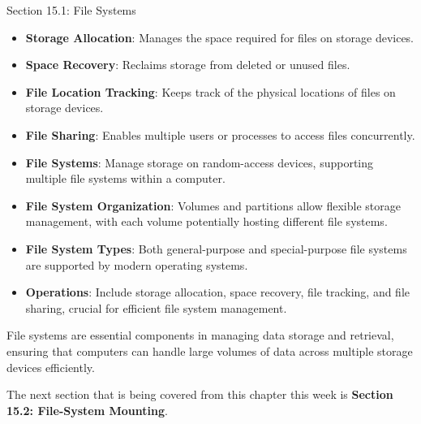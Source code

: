 \begin{notes}{Section 15.1: File Systems}
\begin{highlight}
        \begin{itemize}
            \item \textbf{Storage Allocation}: Manages the space required for files on storage devices.
            \item \textbf{Space Recovery}: Reclaims storage from deleted or unused files.
            \item \textbf{File Location Tracking}: Keeps track of the physical locations of files on storage devices.
            \item \textbf{File Sharing}: Enables multiple users or processes to access files concurrently.
        \end{itemize}
    
    \end{highlight}
    
    \begin{highlight}
    
        \begin{itemize}
            \item \textbf{File Systems}: Manage storage on random-access devices, supporting multiple file systems within a computer.
            \item \textbf{File System Organization}: Volumes and partitions allow flexible storage management, with each volume potentially hosting different file systems.
            \item \textbf{File System Types}: Both general-purpose and special-purpose file systems are supported by modern operating systems.
            \item \textbf{Operations}: Include storage allocation, space recovery, file tracking, and file sharing, crucial for efficient file system management.
        \end{itemize}
    
    File systems are essential components in managing data storage and retrieval, ensuring that computers can handle large volumes of data across multiple storage devices efficiently.
    
    \end{highlight}
\end{notes}

The next section that is being covered from this chapter this week is \textbf{Section 15.2: File-System Mounting}.


